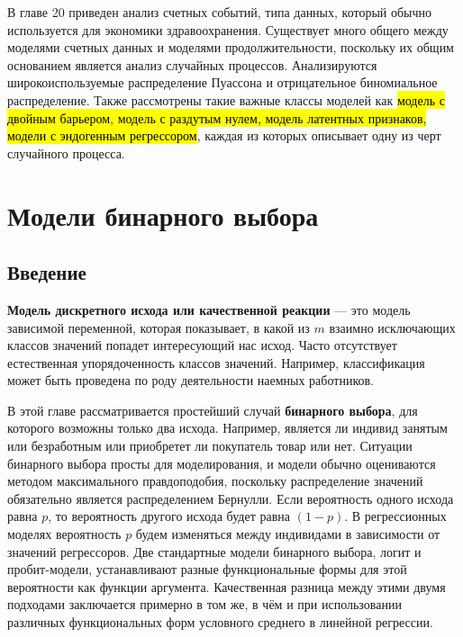 В главе 20 приведен анализ счетных событий,  типа данных,  который обычно используется для экономики здравоохранения. Существует много общего между моделями счетных данных и моделями продолжительности,  поскольку их общим основанием является анализ случайных процессов. Анализируются широкоиспользуемые распределение Пуассона и отрицательное биномиальное распределение. Также рассмотрены  такие важные классы моделей как \hl{модель с двойным барьером,  модель с раздутым нулем,  модель латентных признаков,  модели с эндогенным регрессором},  каждая из которых описывает одну из черт случайного процесса.



\chapter{Модели бинарного выбора}

\section{Введение}

\textbf{Модель дискретного исхода или качественной реакции} --- это модель зависимой переменной, которая показывает, в какой из $m$ взаимно исключающих классов значений попадет интересующий нас исход. Часто отсутствует естественная упорядоченность классов значений. Например,  классификация может быть проведена по роду деятельности наемных работников.

В этой главе рассматривается простейший случай \textbf{бинарного выбора}, для которого возможны только два исхода. Например, является ли индивид занятым или безработным или приобретет ли покупатель товар или нет. Ситуации бинарного выбора просты для моделирования, и модели обычно оцениваются методом максимального правдоподобия,  поскольку распределение значений обязательно является распределением Бернулли. Если вероятность одного исхода равна $p$, то вероятность другого исхода будет равна $\left(1-p\right)$. В регрессионных моделях вероятность $p$ будем изменяться между индивидами в зависимости от значений регрессоров. Две стандартные модели бинарного выбора, логит и пробит-модели,  устанавливают разные функциональные формы для этой вероятности как функции аргумента. Качественная разница между этими двумя подходами заключается примерно в том же,  в чём и при использовании различных функциональных форм условного среднего в линейной регрессии.

